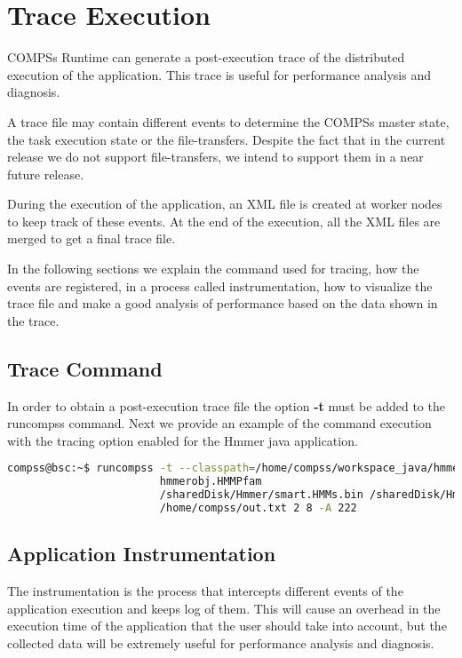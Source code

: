 \section{Trace Execution}
\label{sec:Execution}

COMPSs Runtime can generate a post-execution trace of the distributed execution of the application. This trace is useful for
performance analysis and diagnosis.

A trace file may contain different events to determine the COMPSs master state, the task execution state or the file-transfers.
Despite the fact that in the current release we do not support file-transfers, we intend to support them in a near future release.

During the execution of the application, an XML file is created at worker nodes to keep track of 
these events. At the end of the execution, all the XML files are merged to get a final trace file.

In the following sections we explain the command used for tracing, how the events are registered, 
in a process called instrumentation, how to visualize the trace file and make a good analysis of 
performance based on the data shown in the trace.

\subsection{Trace Command}
In order to obtain a post-execution trace file the option \textbf{-t}  must be added to the runcompss command. Next we provide an
example of the command execution with the tracing option enabled for the Hmmer java application.
\begin{lstlisting}[language=bash]
compss@bsc:~$ runcompss -t --classpath=/home/compss/workspace_java/hmmerobj/jar/hmmerobj.jar 
                        hmmerobj.HMMPfam 
                        /sharedDisk/Hmmer/smart.HMMs.bin /sharedDisk/Hmmer/256seq 
                        /home/compss/out.txt 2 8 -A 222
\end{lstlisting}
 

\subsection{Application Instrumentation}
The instrumentation is the process that intercepts different events of the application execution 
and keeps log of them. This will cause an overhead in the execution time of the application that 
the user should take into account, but the collected data will be extremely useful for performance 
analysis and diagnosis.

